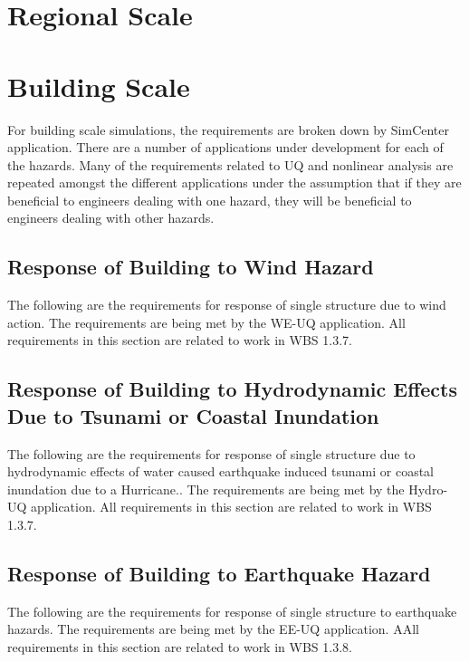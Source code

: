 \documentclass{simcenterdocumentation}
\begin{document}
\section{Regional Scale}


\clearpage
\section{Building Scale}

For building scale simulations, the requirements are broken down by SimCenter application. There are a number of applications under development for each of the hazards. Many of the requirements related to UQ and nonlinear analysis are repeated amongst the different applications under the assumption that if they are beneficial to engineers dealing with one hazard, they will be beneficial to engineers dealing with other hazards.

\subsection{Response of Building to Wind Hazard}
The following are the requirements for response of single structure due to wind action. The requirements are being met by the WE-UQ application. All requirements in this section are related to work in WBS 1.3.7.

 
 
 \clearpage
 \subsection{Response of Building to Hydrodynamic Effects Due to Tsunami or Coastal Inundation}
The following are the requirements for response of single structure due to hydrodynamic effects of water caused earthquake induced tsunami or coastal inundation due to a Hurricane.. The requirements are being met by the Hydro-UQ application. All requirements in this section are related to work in WBS 1.3.7.

 
 

\clearpage
\subsection{Response of Building to Earthquake Hazard}
The following are the requirements for response of single structure to earthquake hazards. The requirements are being met by the EE-UQ application. AAll requirements in this section are related to work in WBS 1.3.8.
\end{document}
